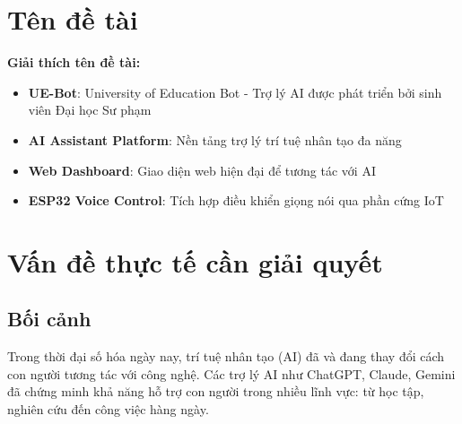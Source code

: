 \documentclass[12pt,a4paper]{article}
\begin{document}
\tableofcontents
\newpage


\section{Tên đề tài}

\begin{center}
\end{center}

\vspace{0.5cm}

\textbf{Giải thích tên đề tài:}
\begin{itemize}
    \item \textbf{UE-Bot}: University of Education Bot - Trợ lý AI được phát triển bởi sinh viên Đại học Sư phạm
    \item \textbf{AI Assistant Platform}: Nền tảng trợ lý trí tuệ nhân tạo đa năng
    \item \textbf{Web Dashboard}: Giao diện web hiện đại để tương tác với AI
    \item \textbf{ESP32 Voice Control}: Tích hợp điều khiển giọng nói qua phần cứng IoT
\end{itemize}

\section{Vấn đề thực tế cần giải quyết}

\subsection{Bối cảnh}

Trong thời đại số hóa ngày nay, trí tuệ nhân tạo (AI) đã và đang thay đổi cách con người tương tác với công nghệ. Các trợ lý AI như ChatGPT, Claude, Gemini đã chứng minh khả năng hỗ trợ con người trong nhiều lĩnh vực: từ học tập, nghiên cứu đến công việc hàng ngày.
\end{document}
